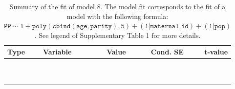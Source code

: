 \begin{table}[H]

\caption{\label{tab:tab8}Summary of the fit of model 8. The model fit corresponds to the fit of a model with the following formula: {\small$\mathtt{PP \sim 1 + poly(cbind(age, parity), 5) + (1 | maternal\_id) + (1 | pop)}$}. See legend of Supplementary Table 1 for more details.}
\centering
\fontsize{8}{10}\selectfont
\begin{tabular}[t]{>{\raggedright\arraybackslash}p{3cm}>{\raggedright\arraybackslash}p{5cm}rrr}
\toprule
Type & Variable & Value & Cond. SE & t-value\\
\midrule
\cellcolor{gray!6}{fixed effects} & \cellcolor{gray!6}{$\beta_1$} & \cellcolor{gray!6}{1.56} & \cellcolor{gray!6}{0.179} & \cellcolor{gray!6}{8.67}\\
\cellcolor{gray!6}{} & \cellcolor{gray!6}{$\beta_{\mathtt{age}}$} & \cellcolor{gray!6}{-421} & \cellcolor{gray!6}{59.7} & \cellcolor{gray!6}{-7.04}\\
\cellcolor{gray!6}{} & \cellcolor{gray!6}{$\beta_{\mathtt{age}^2}$} & \cellcolor{gray!6}{-185} & \cellcolor{gray!6}{51.8} & \cellcolor{gray!6}{-3.57}\\
\cellcolor{gray!6}{} & \cellcolor{gray!6}{$\beta_{\mathtt{age}^3}$} & \cellcolor{gray!6}{-43.4} & \cellcolor{gray!6}{32.6} & \cellcolor{gray!6}{-1.33}\\
\cellcolor{gray!6}{} & \cellcolor{gray!6}{$\beta_{\mathtt{age}^4}$} & \cellcolor{gray!6}{-15.8} & \cellcolor{gray!6}{14.4} & \cellcolor{gray!6}{-1.1}\\
\cellcolor{gray!6}{} & \cellcolor{gray!6}{$\beta_{\mathtt{age}^5}$} & \cellcolor{gray!6}{2.3} & \cellcolor{gray!6}{9.7} & \cellcolor{gray!6}{0.237}\\
\cellcolor{gray!6}{} & \cellcolor{gray!6}{$\beta_{\mathtt{parity}}$} & \cellcolor{gray!6}{48} & \cellcolor{gray!6}{97.7} & \cellcolor{gray!6}{0.491}\\
\cellcolor{gray!6}{} & \cellcolor{gray!6}{$\beta_{\mathtt{age}\times\mathtt{parity}}$} & \cellcolor{gray!6}{13240} & \cellcolor{gray!6}{39545} & \cellcolor{gray!6}{0.335}\\
\cellcolor{gray!6}{} & \cellcolor{gray!6}{$\beta_{\mathtt{age}^2\times\mathtt{parity}}$} & \cellcolor{gray!6}{-34019} & \cellcolor{gray!6}{30565} & \cellcolor{gray!6}{-1.11}\\
\cellcolor{gray!6}{} & \cellcolor{gray!6}{$\beta_{\mathtt{age}^3\times\mathtt{parity}}$} & \cellcolor{gray!6}{-330} & \cellcolor{gray!6}{14760} & \cellcolor{gray!6}{-0.0224}\\

\end{tabular}
\end{table}
